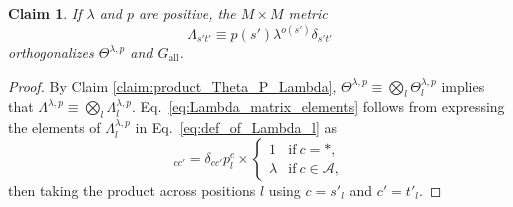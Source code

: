 \documentclass{article}
\numberwithin{myclaim}{section}
\newcommand{\eq}[1]{Eq.\ \ref{#1}}
\newtheorem{claim}{Claim}
\begin{document}
\begin{claim}
If $\lambda$ and $p$ are positive, the $M \times M$ metric 
\begin{equation}
	\Lambda_{s't'} \equiv p(s') \lambda^{o(s')} \delta_{s't'} \label{eq:Lambda_matrix_elements}
\end{equation}
orthogonalizes $\Theta^{\lambda,p}$ and $G_\mathrm{all}$.
\end{claim}

\begin{proof}
By Claim \ref{claim:product_Theta_P_Lambda},  $\Theta^{\lambda,p} \equiv \bigotimes_l \Theta^{\lambda,p}_l$ implies that $\Lambda^{\lambda,p} \equiv \bigotimes_l \Lambda^{\lambda,p}_l$. \eq{eq:Lambda_matrix_elements} follows from expressing the elements of $\Lambda^{\lambda,p}_l$ in \eq{eq:def_of_Lambda_l} as
\begin{equation}
	[\Lambda_l^{\lambda,p}]_{cc'} = \delta_{cc'} p_l^{c} \times \left\{ 
	\begin{array}{cl} 
		1 & \textrm{if}~c=*, \\ 
		\lambda & \textrm{if}~c \in \mathcal{A},
	\end{array} \right.
\end{equation}
then taking the product across positions $l$ using $c = s'_l$ and $c'=t'_l$. 
\end{proof}

%
%
\end{document}
